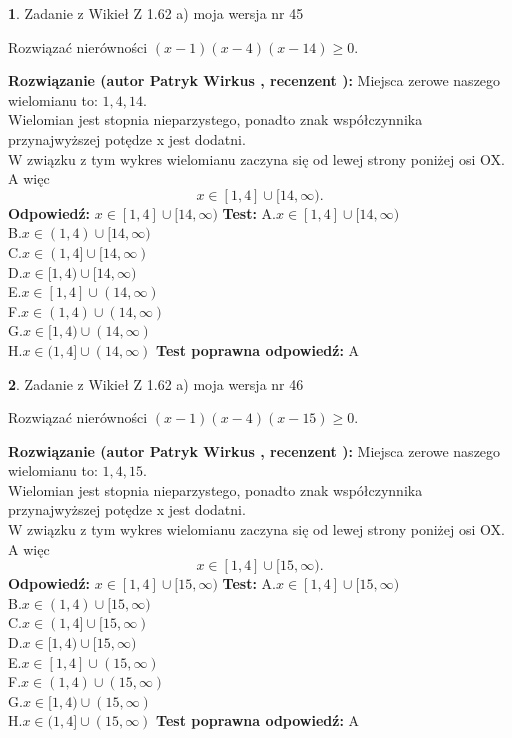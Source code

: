 \documentclass[12pt, a4paper]{article}
\theoremstyle{definition} %
\newtheorem{zad}{}
\newcommand{\zadStart}[1]{\begin{zad}#1\newline}
\newcommand{\zadStop}{\end{zad}}
\newcommand{\rozwStart}[2]{\noindent \textbf{Rozwiązanie (autor #1 , recenzent #2): }\newline}
\newcommand{\rozwStop}{\newline}
\newcommand{\odpStart}{\noindent \textbf{Odpowiedź:}\newline}
\newcommand{\odpStop}{\newline}
\newcommand{\testStart}{\noindent \textbf{Test:}\newline}
\newcommand{\testStop}{\newline}
\newcommand{\kluczStart}{\noindent \textbf{Test poprawna odpowiedź:}\newline}
\newcommand{\kluczStop}{\newline}
\begin{document}
\zadStart{Zadanie z Wikieł Z 1.62 a) moja wersja nr 45}

Rozwiązać nierówności $(x-1)(x-4)(x-14)\ge0$.
\zadStop
\rozwStart{Patryk Wirkus}{}
Miejsca zerowe naszego wielomianu to: $1, 4, 14$.\\
Wielomian jest stopnia nieparzystego, ponadto znak współczynnika przy\linebreak najwyższej potędze x jest dodatni.\\ W związku z tym wykres wielomianu zaczyna się od lewej strony poniżej osi OX. A więc $$x \in [1,4] \cup [14,\infty).$$
\rozwStop
\odpStart
$x \in [1,4] \cup [14,\infty)$
\odpStop
\testStart
A.$x \in [1,4] \cup [14,\infty)$\\
B.$x \in (1,4) \cup [14,\infty)$\\
C.$x \in (1,4] \cup [14,\infty)$\\
D.$x \in [1,4) \cup [14,\infty)$\\
E.$x \in [1,4] \cup (14,\infty)$\\
F.$x \in (1,4) \cup (14,\infty)$\\
G.$x \in [1,4) \cup (14,\infty)$\\
H.$x \in (1,4] \cup (14,\infty)$
\testStop
\kluczStart
A
\kluczStop



\zadStart{Zadanie z Wikieł Z 1.62 a) moja wersja nr 46}

Rozwiązać nierówności $(x-1)(x-4)(x-15)\ge0$.
\zadStop
\rozwStart{Patryk Wirkus}{}
Miejsca zerowe naszego wielomianu to: $1, 4, 15$.\\
Wielomian jest stopnia nieparzystego, ponadto znak współczynnika przy\linebreak najwyższej potędze x jest dodatni.\\ W związku z tym wykres wielomianu zaczyna się od lewej strony poniżej osi OX. A więc $$x \in [1,4] \cup [15,\infty).$$
\rozwStop
\odpStart
$x \in [1,4] \cup [15,\infty)$
\odpStop
\testStart
A.$x \in [1,4] \cup [15,\infty)$\\
B.$x \in (1,4) \cup [15,\infty)$\\
C.$x \in (1,4] \cup [15,\infty)$\\
D.$x \in [1,4) \cup [15,\infty)$\\
E.$x \in [1,4] \cup (15,\infty)$\\
F.$x \in (1,4) \cup (15,\infty)$\\
G.$x \in [1,4) \cup (15,\infty)$\\
H.$x \in (1,4] \cup (15,\infty)$
\testStop
\kluczStart
A
\kluczStop
\end{document}
